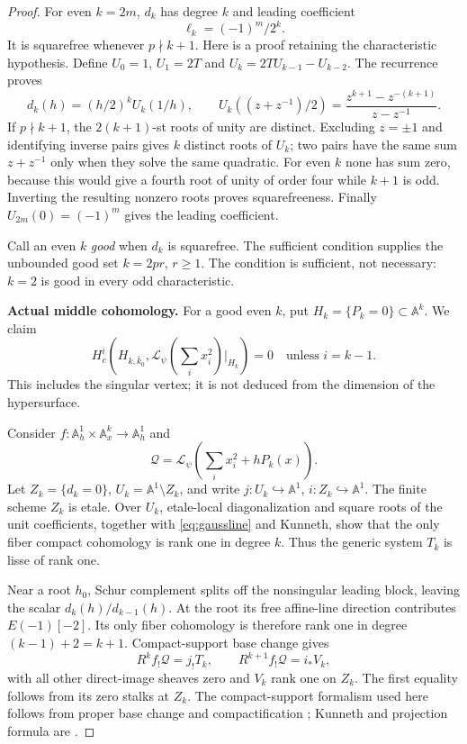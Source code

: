 \documentclass[11pt,a4paper]{article}
\newcommand{\A}{\mathbb A}\newcommand{\PP}{\mathbb P}\newcommand{\GL}{\mathrm{GL}}
\newcommand{\mathscr}{\mathcal}
\theoremstyle{named}\newtheorem{finding}{Finding}[section]
\theoremstyle{definition}\newtheorem{definition}[finding]{Definition}
\theoremstyle{remark}\newtheorem{remark}[finding]{Remark}
\begin{document}
\begin{proof}
For even $k=2m$, $d_k$ has degree $k$ and leading coefficient
\[
 \ell_k=(-1)^m/2^k.
\]
It is squarefree whenever $p\nmid k+1$.
Here is a proof retaining the characteristic hypothesis.
Define $U_0=1$, $U_1=2T$ and
$U_k=2TU_{k-1}-U_{k-2}$. The recurrence proves
\[
 d_k(h)=(h/2)^kU_k(1/h),\qquad
 U_k((z+z^{-1})/2)
   =\frac{z^{k+1}-z^{-(k+1)}}{z-z^{-1}}.
\]
If $p\nmid k+1$, the $2(k+1)$-st roots of unity are distinct.
Excluding $z=\pm1$ and identifying inverse pairs gives $k$
distinct roots of $U_k$; two pairs have the same sum
$z+z^{-1}$ only when they solve the same quadratic.
For even $k$ none has sum zero, because this would give
a fourth root of unity of order four while $k+1$ is odd.
Inverting the resulting nonzero roots proves squarefreeness.
Finally $U_{2m}(0)=(-1)^m$ gives the leading coefficient.

Call an even $k$ \emph{good} when $d_k$ is squarefree.
The sufficient condition supplies the unbounded good set
$k=2pr$, $r\ge1$. The condition is sufficient, not necessary:
$k=2$ is good in every odd characteristic.

\par\smallskip\noindent\textbf{Actual middle cohomology.}\quad
For a good even $k$, put $H_k=\{P_k=0\}\subset\A^k$.
We claim
\begin{equation}\label{eq:gaussmiddle}
 H_c^i(H_{k,\bar k_0},
       \mathcal L_\psi(\textstyle\sum_i x_i^2)|_{H_k})=0
       \quad\text{unless }i=k-1.
\end{equation}
This includes the singular vertex; it is not deduced from
the dimension of the hypersurface.

Consider $f:\A^1_h\times\A^k_x\to\A^1_h$ and
\[
 \mathscr Q=\mathcal L_\psi(\textstyle\sum_i x_i^2+hP_k(x)).
\]
Let $Z_k=\{d_k=0\}$, $U_k=\A^1\setminus Z_k$, and
write $j:U_k\hookrightarrow\A^1$, $i:Z_k\hookrightarrow\A^1$.
The finite scheme $Z_k$ is etale. Over $U_k$, etale-local
diagonalization and square roots of the unit coefficients,
together with \eqref{eq:gaussline} and Kunneth, show that the
only fiber compact cohomology is rank one in degree $k$.
Thus the generic system $T_k$ is lisse of rank one.

Near a root $h_0$, Schur complement splits off the nonsingular
leading block, leaving the scalar $d_k(h)/d_{k-1}(h)$.
At the root its free affine-line direction contributes
$E(-1)[-2]$. Its only fiber cohomology is therefore rank
one in degree $(k-1)+2=k+1$. Compact-support base change gives
\[
 R^kf_!\mathscr Q=j_!T_k,\qquad
 R^{k+1}f_!\mathscr Q=i_*V_k,
\]
with all other direct-image sheaves zero and $V_k$ rank one
on $Z_k$. The first equality follows from its zero stalks
at $Z_k$. The compact-support formalism used here follows
from proper base change and compactification
\cite[Theorem~17.10, p.~116; Proposition~18.4,
pp.~121--122]{Milne}; Kunneth and projection formula are
\cite[Theorem~22.1, Remarks~22.3(b),(d), and
Proposition~22.5, pp.~135--137]{Milne}.


\end{proof}
\end{document}
